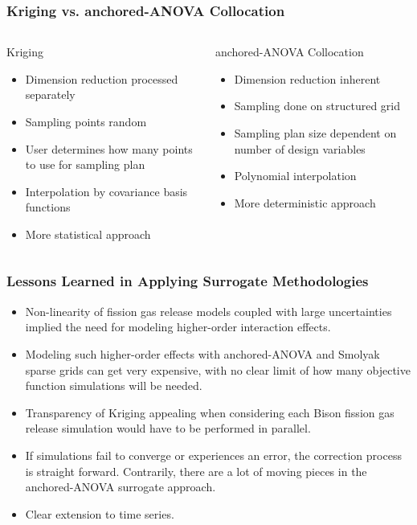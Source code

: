 \begin{frame}
\frametitle{Kriging vs. anchored-ANOVA Collocation}

\begin{columns}
 \begin{column}{0.5\textwidth}
  Kriging
  \begin{itemize}
    \item Dimension reduction processed separately
    \item Sampling points random
    \item User determines how many points to use for sampling plan
    \item Interpolation by covariance basis functions
    \item More statistical approach
  \end{itemize}
 \end{column}
 \begin{column}{0.5\textwidth}
 anchored-ANOVA Collocation
  \begin{itemize}
    \item Dimension reduction inherent
    \item Sampling done on structured grid
    \item Sampling plan size dependent on number of design variables
    \item Polynomial interpolation
    \item More deterministic approach
  \end{itemize}
 \end{column}
\end{columns}

\end{frame}
\begin{frame}
\frametitle{Lessons Learned in Applying Surrogate Methodologies}

\begin{itemize}
  \item Non-linearity of fission gas release models coupled with large uncertainties implied the need for modeling higher-order interaction effects. 
  \item Modeling such higher-order effects with anchored-ANOVA and Smolyak sparse grids can get very expensive, with no clear limit of how many objective function simulations will be needed. 
  \item Transparency of Kriging appealing when considering each Bison fission gas release simulation would have to be performed in parallel.
  \item If simulations fail to converge or experiences an error, the correction process is straight forward. Contrarily, there are a lot of moving pieces in the anchored-ANOVA surrogate approach. 
  \item Clear extension to time series. 
\end{itemize}

\end{frame}
